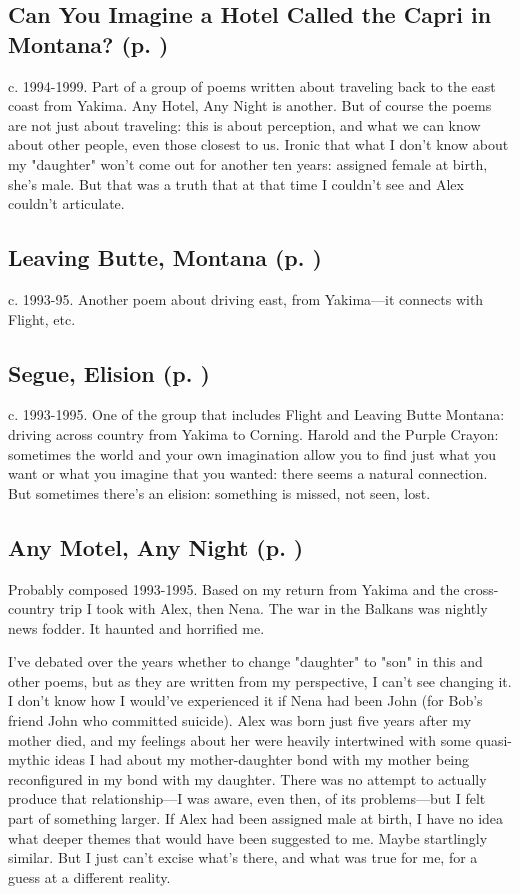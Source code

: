 \subsection*{Can You Imagine a Hotel Called the Capri in Montana? (p. \pageref{ch:can_you_imagine})}
c. 1994-1999. Part of a group of poems written about
traveling back to the east coast from Yakima. Any Hotel, Any Night is
another. But of course the poems are not just about traveling: this is
about perception, and what we can know about other people, even those
closest to us. Ironic that what I don't know about my "daughter" won't
come out for another ten years: assigned female at birth, she's male.
But that was a truth that at that time I couldn't see and Alex couldn't
articulate.

\subsection*{Leaving Butte, Montana (p. \pageref{ch:leaving_butte})}
c. 1993-95. Another poem about driving east, from
Yakima---it connects with Flight, etc.

\subsection*{Segue, Elision (p. \pageref{ch:segue_elision})}
c. 1993-1995. One of the group that includes Flight and
Leaving Butte Montana: driving across country from Yakima to Corning.
Harold and the Purple Crayon: sometimes the world and your own
imagination allow you to find just what you want or what you imagine
that you wanted: there seems a natural connection. But sometimes there's
an elision: something is missed, not seen, lost.

\subsection*{Any Motel, Any Night (p. \pageref{ch:any_motel})}
Probably composed 1993-1995. Based on my return from
Yakima and the cross-country trip I took with Alex, then Nena. The war
in the Balkans was nightly news fodder. It haunted and horrified me.

I've debated over the years whether to change "daughter" to "son" in
this and other poems, but as they are written from my perspective, I
can't see changing it. I don't know how I would've experienced it if
Nena had been John (for Bob's friend John who committed suicide). Alex
was born just five years after my mother died, and my feelings about her
were heavily intertwined with some quasi-mythic ideas I had about my
mother-daughter bond with my mother being reconfigured in my bond with
my daughter. There was no attempt to actually produce that
relationship---I was aware, even then, of its problems---but I felt
part of something larger. If Alex had been assigned male at birth, I
have no idea what deeper themes that would have been suggested to me.
Maybe startlingly similar. But I just can't excise what's there, and
what was true for me, for a guess at a different
reality.

